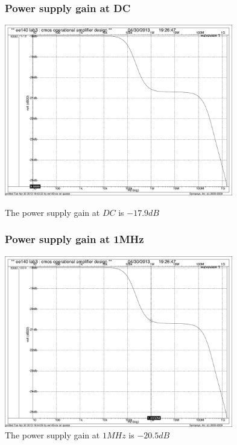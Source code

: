 \documentclass[]{article}
\begin{document}
		\begin{figure}
			\subsubsection{ Power supply gain at DC}
			\includegraphics[width=0.89\textwidth]{psrr_DC.pdf}
			\caption{The power supply gain at $DC$ is $-17.9dB$}
			\subsubsection{Power supply gain at 1MHz}
			\includegraphics[width=0.89\textwidth]{psrr_1MHz.pdf}
			\caption{The power supply gain at $1MHz$ is $-20.5dB$}
		\end{figure}
		
\end{document}
